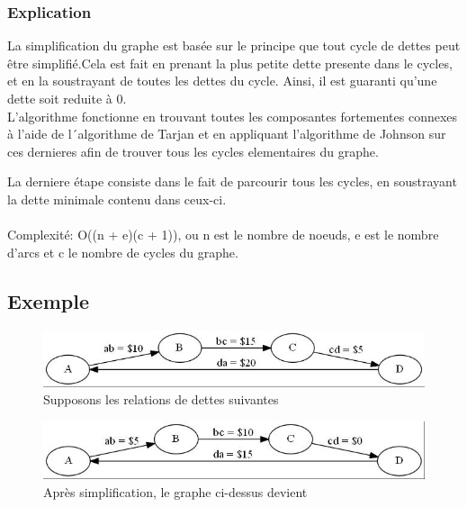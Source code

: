 \documentclass[12pt, oneside]{article}
\begin{document}
\subsubsection{Explication}
La simplification du graphe est basée sur le principe que tout cycle de dettes peut être simplifié.Cela est fait en prenant la plus petite dette presente dans le cycles, et en la soustrayant de toutes les dettes du cycle. Ainsi, il est guaranti qu'une dette soit reduite à 0.\\

L'algorithme fonctionne en trouvant toutes les composantes fortementes connexes à l'aide de l´algorithme de Tarjan et en appliquant l'algorithme de Johnson sur ces dernieres afin de trouver tous les cycles elementaires du graphe.

La derniere étape consiste dans le fait de parcourir tous les cycles, en soustrayant la dette minimale contenu dans ceux-ci.\\\\
Complexité: O((n + e)(c + 1)), ou n est le nombre de noeuds, e est le nombre d'arcs et c le nombre de cycles du graphe.

\FloatBarrier
\subsection{Exemple}
\begin{figure}[!h]
    \includegraphics[trim=3 3 3 3,clip]{2_1_0}
    \caption{Supposons les relations de dettes suivantes}
\end{figure}

\begin{figure}[!h]
    \includegraphics[trim=3 3 3 3,clip]{2_1_Simplified}
    \caption{Après simplification, le graphe ci-dessus devient}
\end{figure}

\newpage
\end{document}
